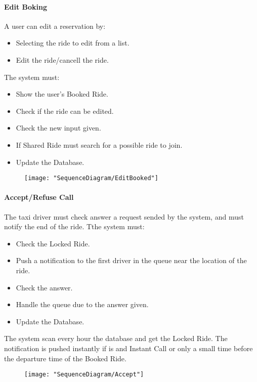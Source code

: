 		\paragraph{Edit Boking}
			A user can edit a reservation by:\begin{itemize}
				\item Selecting the ride to edit from a list.
				\item Edit the ride/cancell the ride.
			\end{itemize}
			The system must:\begin{itemize}
				\item Show the user's Booked Ride.
				\item Check if the ride can be edited.
				\item Check the new input given.
				\item If Shared Ride must search for a possible ride to join\askpippo.
				\item Update the Database.
			\end{itemize}
				\newpage
				\begin{figure}[h!]
					\centering
					\texttt{[image: "SequenceDiagram/EditBooked"]}
				\end{figure}
				\newpage

			\paragraph{Accept/Refuse Call}
				The taxi driver must check answer a request sended by the system, and must notify the end of the ride.
				Tthe system must:\begin{itemize}
					\item Check the Locked Ride.
					\item Push a notification to the first driver in the queue near the location of the ride.
					\item Check the answer.
					\item Handle the queue due to the answer given.
					\item Update the Database.
				\end{itemize}
				The system scan every hour the database and get the Locked Ride.
				The notification is pushed instantly if is and Instant Call or only a small time before the departure time of the Booked Ride\askpippo.
				\newpage
				\begin{figure}[h!]
					\centering
					\texttt{[image: "SequenceDiagram/Accept"]}
				\end{figure}
				\newpage


